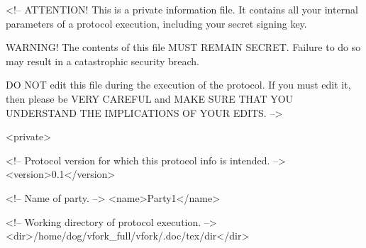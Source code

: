 
<!-- ATTENTION! This is a private information file. It contains all 
     your internal parameters of a protocol execution, including 
     your secret signing key.
     
     WARNING! The contents of this file MUST REMAIN SECRET. Failure 
     to do so may result in a catastrophic security breach.
     
     DO NOT edit this file during the execution of the protocol. If 
     you must edit it, then please be VERY CAREFUL and MAKE SURE 
     THAT YOU UNDERSTAND THE IMPLICATIONS OF YOUR EDITS. -->

<private>

   <!-- Protocol version for which this protocol info is intended. -->
   <version>0.1</version>

   <!-- Name of party. -->
   <name>Party1</name>

   <!-- Working directory of protocol execution. -->
   <dir>/home/dog/vfork_full/vfork/.doc/tex/dir</dir>

